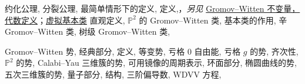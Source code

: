 \begin{theindex}
\subsubitem \leavevmode\hypertarget{idx:0506}{约化公理},\enspace{}
\subsubitem \leavevmode\hypertarget{idx:0507}{分裂公理},\enspace{}
\subitem \leavevmode\hypertarget{idx:0508}{最简单情形下的定义},\enspace{}
\subitem \leavevmode\hypertarget{idx:0509}{定义},\enspace{}，\textit{另见} \hyperlink{idx:0516}{Gromov--Witten 不变量，代数定义}；\hyperlink{idx:1406}{虚拟基本类}
\subitem \leavevmode\hypertarget{idx:0510}{直观定义},\enspace{}
\subitem \leavevmode\hypertarget{idx:0511}{$\mathbb P^2$ 的 Gromov--Witten 类},\enspace{}
\subitem \leavevmode\hypertarget{idx:0512}{基本类的作用},\enspace{}
\subitem \leavevmode\hypertarget{idx:0513}{辛 Gromov--Witten 类},\enspace{}
\subitem \leavevmode\hypertarget{idx:0514}{树级 Gromov--Witten 类},\enspace{}
\indexspace
\item \leavevmode\hypertarget{idx:0552}{Gromov--Witten 势},\enspace{}
\subitem \leavevmode\hypertarget{idx:0553}{经典部分},\enspace{}
\subitem \leavevmode\hypertarget{idx:0554}{定义},\enspace{}
\subitem \leavevmode\hypertarget{idx:0555}{等变势},\enspace{}
\subitem \leavevmode\hypertarget{idx:0556}{亏格 $0$ 自由能},\enspace{}
\subitem \leavevmode\hypertarget{idx:0557}{亏格 $g$ 的势},\enspace{}
\subitem \leavevmode\hypertarget{idx:0558}{齐次性},\enspace{}
\subitem \leavevmode\hypertarget{idx:0559}{$\mathbb P^2$ 的势},\enspace{}
\subitem \leavevmode\hypertarget{idx:0560}{Calabi--Yau 三维簇的势},\enspace{}
\subsubitem \leavevmode\hypertarget{idx:0561}{可用镜像的周期表示},\enspace{}
\subsubitem \leavevmode\hypertarget{idx:0562}{环面部分},\enspace{}
\subitem \leavevmode\hypertarget{idx:0563}{椭圆曲线的势},\enspace{}
\subitem \leavevmode\hypertarget{idx:0564}{五次三维簇的势},\enspace{}
\subitem \leavevmode\hypertarget{idx:0565}{量子部分},\enspace{}
\subitem \leavevmode\hypertarget{idx:0566}{结构},\enspace{}
\subitem \leavevmode\hypertarget{idx:0567}{三阶偏导数},\enspace{}
\subitem \leavevmode\hypertarget{idx:0568}{WDVV 方程},\enspace{}

\end{theindex}
